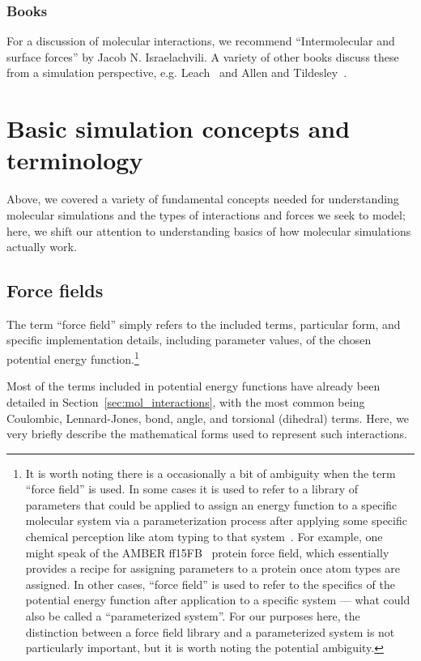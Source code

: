 \documentclass[9pt,bestpractices]{livecoms}
\begin{document}
\subsubsection{Books}
For a discussion of molecular interactions, we recommend ``Intermolecular and surface forces'' by Jacob N. Israelachvili.
A variety of other books discuss these from a simulation perspective, e.g. Leach~\cite{LeachBook} and Allen and Tildesley~\cite{allen_computer_2017}.


\section{Basic simulation concepts and terminology}
\label{sec:basics}

Above, we covered a variety of fundamental concepts needed for understanding molecular simulations and the types of interactions and forces we seek to model; here, we shift our attention to understanding basics of how molecular simulations actually work.

\subsection{Force fields}
\label{sec:force_fields}

The term ``force field'' simply refers to the included terms, particular form, and specific implementation details, including parameter values, of the 
chosen potential energy function.\footnote{It is worth noting there is a occasionally a bit of ambiguity when the term ``force field'' is used.
In some cases it is used to refer to a library of parameters that could be applied to assign an energy function to a specific molecular system via a parameterization process after applying some specific chemical perception like atom typing to that system~\citep{Mobley:2018:bioRxiv}.
For example, one might speak of the AMBER ff15FB~\citep{amber15FB} protein force field, which essentially provides a recipe for assigning parameters to a protein once atom types are assigned.
In other cases, ``force field'' is used to refer to the specifics of the potential energy function after application to a specific system --- what could also be called a ``parameterized system''. 
For our purposes here, the distinction between a force field library and a parameterized system is not particularly important, but it is worth noting the potential ambiguity. }

Most of the terms included in potential energy functions have already been detailed in Section~\ref{sec:mol_interactions}, with the most common being Coulombic, Lennard-Jones, bond, angle, and torsional (dihedral) terms. 
Here, we very briefly describe the mathematical forms used to represent such interactions.
\end{document}

